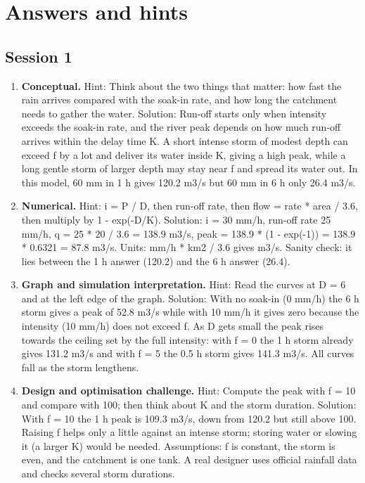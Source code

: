 \documentclass[11pt,a4paper]{article}
\begin{document}
\section{Answers and hints}

\subsection*{Session 1}
\begin{enumerate}[nosep]
\item \textbf{Conceptual.} Hint: Think about the two things that matter: how fast the rain arrives compared with the soak-in rate, and how long the catchment needs to gather the water. Solution: Run-off starts only when intensity exceeds the soak-in rate, and the river peak depends on how much run-off arrives within the delay time K. A short intense storm of modest depth can exceed f by a lot and deliver its water inside K, giving a high peak, while a long gentle storm of larger depth may stay near f and spread its water out. In this model, 60 mm in 1 h gives 120.2 m3/s but 60 mm in 6 h only 26.4 m3/s.
\item \textbf{Numerical.} Hint: i = P / D, then run-off rate, then flow = rate * area / 3.6, then multiply by 1 - exp(-D/K). Solution: i = 30 mm/h, run-off rate 25 mm/h, q = 25 * 20 / 3.6 = 138.9 m3/s, peak = 138.9 * (1 - exp(-1)) = 138.9 * 0.6321 = 87.8 m3/s. Units: mm/h * km2 / 3.6 gives m3/s. Sanity check: it lies between the 1 h answer (120.2) and the 6 h answer (26.4).
\item \textbf{Graph and simulation interpretation.} Hint: Read the curves at D = 6 and at the left edge of the graph. Solution: With no soak-in (0 mm/h) the 6 h storm gives a peak of 52.8 m3/s while with 10 mm/h it gives zero because the intensity (10 mm/h) does not exceed f. As D gets small the peak rises towards the ceiling set by the full intensity: with f = 0 the 1 h storm already gives 131.2 m3/s and with f = 5 the 0.5 h storm gives 141.3 m3/s. All curves fall as the storm lengthens.
\item \textbf{Design and optimisation challenge.} Hint: Compute the peak with f = 10 and compare with 100; then think about K and the storm duration. Solution: With f = 10 the 1 h peak is 109.3 m3/s, down from 120.2 but still above 100. Raising f helps only a little against an intense storm; storing water or slowing it (a larger K) would be needed. Assumptions: f is constant, the storm is even, and the catchment is one tank. A real designer uses official rainfall data and checks several storm durations.
\end{enumerate}
\end{document}
